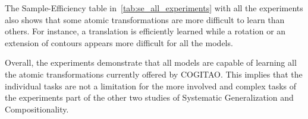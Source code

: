 The Sample-Efficiency table in~\ref{tab:se_all_experiments} with all the experiments also shows that some atomic transformations are more difficult to learn than others. For instance, a translation is efficiently learned while a rotation or an extension of contours appears more difficult for all the models.

Overall, the experiments demonstrate that all models are capable of learning all the atomic transformations currently offered by COGITAO. This implies that the individual tasks are not a limitation for the more involved and complex tasks of the experiments part of the other two studies of Systematic Generalization and Compositionality.


\begin{table}[htbp]
  \centering
  \label{tab:se_all_experiments}
\end{table}

